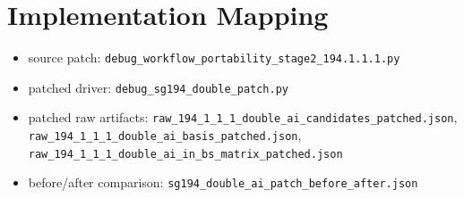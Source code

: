 \documentclass[11pt]{article}
\begin{document}
\section*{Implementation Mapping}
\begin{itemize}
\item source patch: \texttt{debug\_workflow\_portability\_stage2\_194.1.1.1.py}
\item patched driver: \texttt{debug\_sg194\_double\_patch.py}
\item patched raw artifacts: \texttt{raw\_194\_1\_1\_1\_double\_ai\_candidates\_patched.json}, \texttt{raw\_194\_1\_1\_1\_double\_ai\_basis\_patched.json}, \texttt{raw\_194\_1\_1\_1\_double\_ai\_in\_bs\_matrix\_patched.json}
\item before/after comparison: \texttt{sg194\_double\_ai\_patch\_before\_after.json}
\end{itemize}
\end{document}
